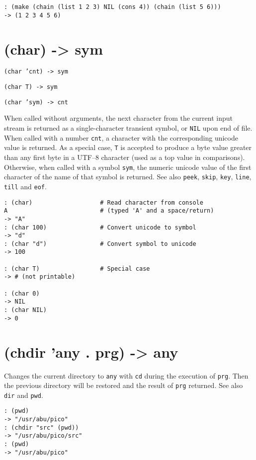 {\begin{verbatim}
: (make (chain (list 1 2 3) NIL (cons 4)) (chain (list 5 6)))
-> (1 2 3 4 5 6)
\end{verbatim}

 
\section{(char) -> sym}
\label{sec-8-1-3-14}


\texttt{(char 'cnt) -> sym}

\texttt{(char T) -> sym}

\texttt{(char 'sym) -> cnt}

When called without arguments, the next character from the current input
stream is returned as a single-character transient symbol, or \texttt{NIL} upon
end of file. When called with a number \texttt{cnt}, a character with the
corresponding unicode value is returned. As a special case, \texttt{T} is
accepted to produce a byte value greater than any first byte in a UTF--8
character (used as a top value in comparisons). Otherwise, when called
with a symbol \texttt{sym}, the numeric unicode value of the first character of
the name of that symbol is returned. See also \texttt{peek}, \texttt{skip}, \texttt{key},
\texttt{line}, \texttt{till} and \texttt{eof}.


\begin{verbatim}
: (char)                   # Read character from console
A                          # (typed 'A' and a space/return)
-> "A"
: (char 100)               # Convert unicode to symbol
-> "d"
: (char "d")               # Convert symbol to unicode
-> 100

: (char T)                 # Special case
-> # (not printable)

: (char 0)
-> NIL
: (char NIL)
-> 0
\end{verbatim}

 
\section{(chdir 'any . prg) -> any}
\label{sec-8-1-3-15}


Changes the current directory to \texttt{any} with \texttt{cd} during the execution of
\texttt{prg}. Then the previous directory will be restored and the result of
\texttt{prg} returned. See also \texttt{dir} and \texttt{pwd}.


\begin{verbatim}
: (pwd)
-> "/usr/abu/pico"
: (chdir "src" (pwd))
-> "/usr/abu/pico/src"
: (pwd)
-> "/usr/abu/pico"
\end{verbatim}

}
